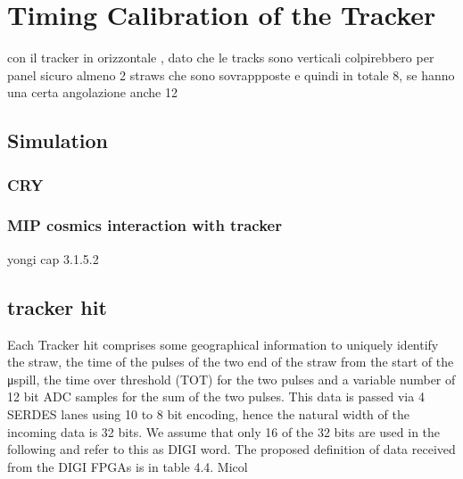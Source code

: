 \chapter{Timing Calibration of the Tracker}
con il tracker in orizzontale , dato che le tracks sono verticali colpirebbero per panel sicuro almeno 2 straws che sono sovrappposte e quindi in totale 8, se hanno una certa angolazione anche 12
\section{Simulation}
\subsection{CRY}
\subsection{MIP cosmics interaction with tracker}
yongi cap 3.1.5.2
\section{tracker hit}
Each Tracker hit comprises some geographical information to uniquely identify
the straw, the time of the pulses of the two end of the straw from the start of the
μspill, the time over threshold (TOT) for the two pulses and a variable number
of 12 bit ADC samples for the sum of the two pulses. This data is passed via 4
SERDES lanes using 10 to 8 bit encoding, hence the natural width of the incoming
data is 32 bits. We assume that only 16 of the 32 bits are used in the following
and refer to this as DIGI word. The proposed definition of data received from the
DIGI FPGAs is in table 4.4.
Micol 




